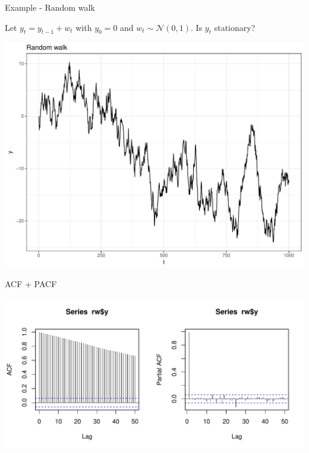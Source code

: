 \documentclass[11pt,ignorenonframetext,]{beamer}
\begin{document}
\begin{frame}[t]{Example - Random walk}

Let \(y_t = y_{t-1} + w_t\) with \(y_0=0\) and
\(w_t \sim \mathcal{N}(0,1)\). Is \(y_t\) stationary?

\includegraphics{Lec6_files/figure-beamer/unnamed-chunk-1-1.pdf}

\end{frame}

\begin{frame}{ACF + PACF}

\includegraphics{Lec6_files/figure-beamer/unnamed-chunk-2-1.pdf}

\end{frame}
\end{document}
